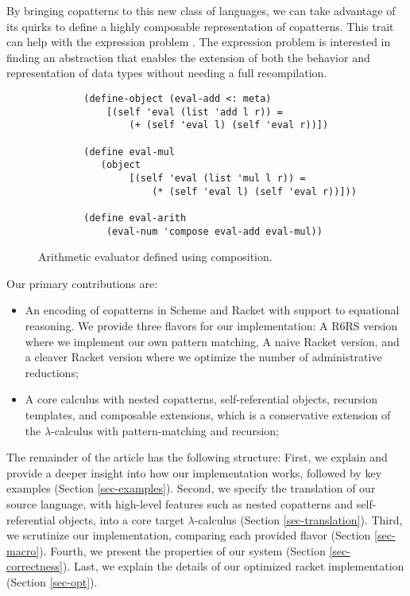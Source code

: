 By bringing copatterns to this new class of languages, we can take advantage of its quirks to define a highly composable representation of copatterns.
This trait can help with the expression problem \cite{ExpressionProblem}.
The expression problem is interested in finding an abstraction that enables the extension of both the behavior and representation of data types without needing a full recompilation.
\begin{figure}
    \begin{verbatim}
        (define-object (eval-add <: meta)
            [(self 'eval (list 'add l r)) =
                (+ (self 'eval l) (self 'eval r))])

        (define eval-mul
           (object
                [(self 'eval (list 'mul l r)) =
                    (* (self 'eval l) (self 'eval r))]))
      
        (define eval-arith
            (eval-num 'compose eval-add eval-mul))
    \end{verbatim}
    \caption{Arithmetic evaluator defined using composition.}
    \label{fig:ex-arith-eval}
\end{figure}

Our primary contributions are:
\begin{itemize}
    \item An encoding of copatterns in Scheme and Racket with support to equational reasoning.
    We provide three flavors for our implementation: A R6RS version where we implement our own pattern matching, A naive Racket version, and a cleaver Racket version where we optimize the number of administrative reductions;
    \item A core calculus with nested copatterns, self-referential objects, recursion templates, and composable extensions, which is a conservative extension of the $\lambda$-calculus with pattern-matching and recursion;
\end{itemize} 

The remainder of the article has the following structure: First, we explain and provide a deeper insight into how our implementation works, followed by key examples (Section \ref{sec-examples}).
Second, we specify the translation of our source language, with high-level features such as nested copatterns and self-referential objects, into a core target $\lambda$-calculus (Section \ref{sec-translation}).
Third, we scrutinize our implementation, comparing each provided flavor (Section \ref{sec-macro}).
Fourth, we present the properties of our system (Section \ref{sec-correctness}).
Last, we explain the details of our optimized racket implementation (Section \ref{sec-opt}).
